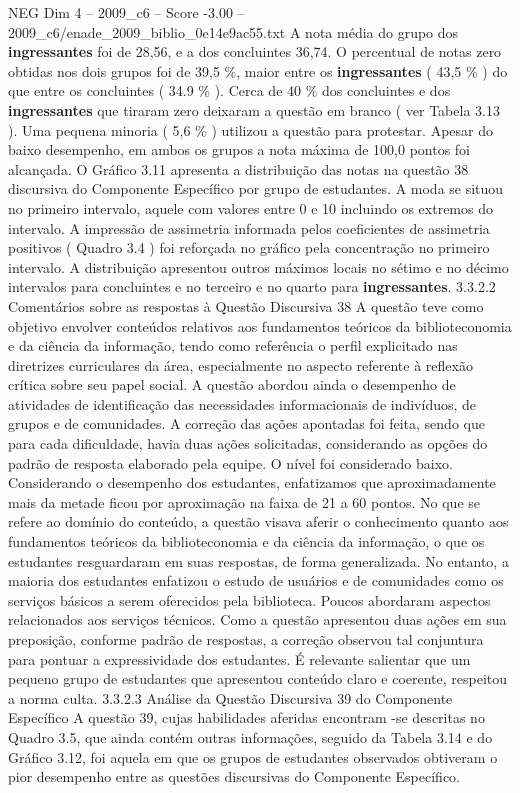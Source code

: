 \begin{textsample}{NEG Dim 4 – 2009\_c6 – Score -3.00 – 2009\_c6/enade\_2009\_biblio\_0e14e9ac55.txt}
A nota média do grupo dos \textbf{ingressantes} foi de 28,56, e a dos concluintes 36,74.
O percentual de notas zero obtidas nos dois grupos foi de 39,5 \%, maior entre os \textbf{ingressantes} ( 43,5 \% ) do que entre os concluintes ( 34.9 \% ).
Cerca de 40 \% dos concluintes e dos \textbf{ingressantes} que tiraram zero deixaram a questão em branco ( ver Tabela 3.13 ).
Uma pequena minoria ( 5,6 \% ) utilizou a questão para protestar.
Apesar do baixo desempenho, em ambos os grupos a nota máxima de 100,0 pontos foi alcançada.
O Gráfico 3.11 apresenta a distribuição das notas na questão 38 discursiva do Componente Específico por grupo de estudantes.
A moda se situou no primeiro intervalo, aquele com valores entre 0 e 10 incluindo os extremos do intervalo.
A impressão de assimetria informada pelos coeficientes de assimetria positivos ( Quadro 3.4 ) foi reforçada no gráfico pela concentração no primeiro intervalo.
A distribuição apresentou outros máximos locais no sétimo e no décimo intervalos para concluintes e no terceiro e no quarto para \textbf{ingressantes}. 3.3.2.2 Comentários sobre as respostas à Questão Discursiva 38 A questão teve como objetivo envolver conteúdos relativos aos fundamentos teóricos da biblioteconomia e da ciência da informação, tendo como referência o perfil explicitado nas diretrizes curriculares da área, especialmente no aspecto referente à reflexão crítica sobre seu papel social.
A questão abordou ainda o desempenho de atividades de identificação das necessidades informacionais de indivíduos, de grupos e de comunidades.
A correção das ações apontadas foi feita, sendo que para cada dificuldade, havia duas ações solicitadas, considerando as opções do padrão de resposta elaborado pela equipe.
O nível foi considerado baixo.
Considerando o desempenho dos estudantes, enfatizamos que aproximadamente mais da metade ficou por aproximação na faixa de 21 a 60 pontos.
No que se refere ao domínio do conteúdo, a questão visava aferir o conhecimento quanto aos fundamentos teóricos da biblioteconomia e da ciência da informação, o que os estudantes resguardaram em suas respostas, de forma generalizada.
No entanto, a maioria dos estudantes enfatizou o estudo de usuários e de comunidades como os serviços básicos a serem oferecidos pela biblioteca.
Poucos abordaram aspectos relacionados aos serviços técnicos.
Como a questão apresentou duas ações em sua preposição, conforme padrão de respostas, a correção observou tal conjuntura para pontuar a expressividade dos estudantes.
É relevante salientar que um pequeno grupo de estudantes que apresentou conteúdo claro e coerente, respeitou a norma culta. 3.3.2.3 Análise da Questão Discursiva 39 do Componente Específico A questão 39, cujas habilidades aferidas encontram -se descritas no Quadro 3.5, que ainda contém outras informações, seguido da Tabela 3.14 e do Gráfico 3.12, foi aquela em que os grupos de estudantes observados obtiveram o pior desempenho entre as questões discursivas do Componente Específico.

\end{textsample}

